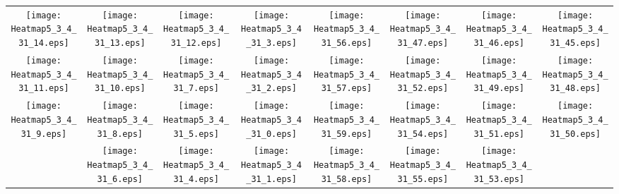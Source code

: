 \documentclass{standalone}
\begin{document}
\begin{tabular}{ *8{c} }
\texttt{[image: Heatmap5\_3\_4\_31\_14.eps]} & \texttt{[image: Heatmap5\_3\_4\_31\_13.eps]} & \texttt{[image: Heatmap5\_3\_4\_31\_12.eps]} & \texttt{[image: Heatmap5\_3\_4\_31\_3.eps]} & \texttt{[image: Heatmap5\_3\_4\_31\_56.eps]} & \texttt{[image: Heatmap5\_3\_4\_31\_47.eps]} & \texttt{[image: Heatmap5\_3\_4\_31\_46.eps]} & \texttt{[image: Heatmap5\_3\_4\_31\_45.eps]} \\
\texttt{[image: Heatmap5\_3\_4\_31\_11.eps]} & \texttt{[image: Heatmap5\_3\_4\_31\_10.eps]} & \texttt{[image: Heatmap5\_3\_4\_31\_7.eps]} & \texttt{[image: Heatmap5\_3\_4\_31\_2.eps]} & \texttt{[image: Heatmap5\_3\_4\_31\_57.eps]} & \texttt{[image: Heatmap5\_3\_4\_31\_52.eps]} & \texttt{[image: Heatmap5\_3\_4\_31\_49.eps]} & \texttt{[image: Heatmap5\_3\_4\_31\_48.eps]} \\
\texttt{[image: Heatmap5\_3\_4\_31\_9.eps]} & \texttt{[image: Heatmap5\_3\_4\_31\_8.eps]} & \texttt{[image: Heatmap5\_3\_4\_31\_5.eps]} & \texttt{[image: Heatmap5\_3\_4\_31\_0.eps]} & \texttt{[image: Heatmap5\_3\_4\_31\_59.eps]} & \texttt{[image: Heatmap5\_3\_4\_31\_54.eps]} & \texttt{[image: Heatmap5\_3\_4\_31\_51.eps]} & \texttt{[image: Heatmap5\_3\_4\_31\_50.eps]} \\
 & \texttt{[image: Heatmap5\_3\_4\_31\_6.eps]} & \texttt{[image: Heatmap5\_3\_4\_31\_4.eps]} & \texttt{[image: Heatmap5\_3\_4\_31\_1.eps]} & \texttt{[image: Heatmap5\_3\_4\_31\_58.eps]} & \texttt{[image: Heatmap5\_3\_4\_31\_55.eps]} & \texttt{[image: Heatmap5\_3\_4\_31\_53.eps]} &  
\end{tabular}
\end{document}
